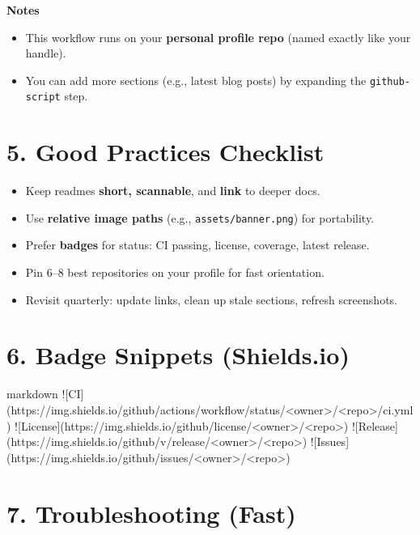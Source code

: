 \documentclass[11pt]{article}
\renewcommand{\kbd}[1]{\texttt{#1}}
\begin{document}
\begin{tcolorbox}
\textbf{Notes}
\begin{itemize}
  \item This workflow runs on your \textbf{personal profile repo} (named exactly like your handle).
  \item You can add more sections (e.g., latest blog posts) by expanding the \kbd{github-script} step.
\end{itemize}
\end{tcolorbox}

\section*{5. Good Practices Checklist}

\begin{itemize}
  \item Keep readmes \textbf{short, scannable}, and \textbf{link} to deeper docs.
  \item Use \textbf{relative image paths} (e.g., \kbd{assets/banner.png}) for portability.
  \item Prefer \textbf{badges} for status: CI passing, license, coverage, latest release.
  \item Pin 6--8 best repositories on your profile for fast orientation.
  \item Revisit quarterly: update links, clean up stale sections, refresh screenshots.
\end{itemize}

\section*{6. Badge Snippets (Shields.io)}

\begin{code}{markdown}
![CI](https://img.shields.io/github/actions/workflow/status/<owner>/<repo>/ci.yml)
![License](https://img.shields.io/github/license/<owner>/<repo>)
![Release](https://img.shields.io/github/v/release/<owner>/<repo>)
![Issues](https://img.shields.io/github/issues/<owner>/<repo>)
\end{code}

\section*{7. Troubleshooting (Fast)}
\end{document}
